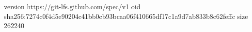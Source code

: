 version https://git-lfs.github.com/spec/v1
oid sha256:7274c0f4d5e90204c41bb0cb93bcaa06f410665df17c1a9d7ab833b8c62feffc
size 262240
